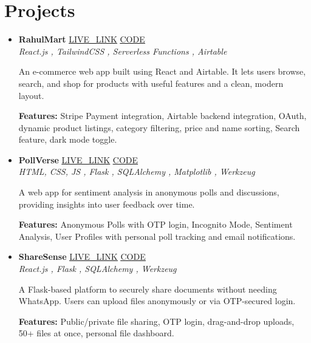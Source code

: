 \documentclass[letterpaper,10pt]{article}
\begin{document}
\section{Projects}
\begin{itemize}

  \item \textbf{RahulMart} \hfill
    \underline{\href{https://rahulmart.netlify.app}{LIVE\_LINK}} \hspace{0.3cm}
    \underline{\href{https://github.com/Rahul122703/rahulmart}{CODE}} \\
  \textit{React.js , TailwindCSS , Serverless Functions , Airtable}

  An e-commerce web app built using React and Airtable. It lets users browse, search, and shop for products with useful features and a clean, modern layout.

  \textbf{Features:} Stripe Payment integration, Airtable backend integration, OAuth, dynamic product listings, category filtering, price and name sorting, Search feature, dark mode toggle.

  \item \textbf{PollVerse} \hfill
    \underline{\href{https://pollversey.onrender.com}{LIVE\_LINK}} \hspace{0.3cm}
    \underline{\href{https://github.com/Rahul122703/pollverse}{CODE}} \\
  \textit{HTML, CSS, JS , Flask , SQLAlchemy , Matplotlib , Werkzeug}

  A web app for sentiment analysis in anonymous polls and discussions, providing insights into user feedback over time.

  \textbf{Features:} Anonymous Polls with OTP login, Incognito Mode, Sentiment Analysis, User Profiles with personal poll tracking and email notifications.

  \item \textbf{ShareSense} \hfill
  \underline{\href{https://sharesense.onrender.com}{LIVE\_LINK}} \hspace{0.3cm}
  \underline{\href{https://github.com/Rahul122703/rshare}{CODE}} \\
  \textit{React.js , Flask , SQLAlchemy , Werkzeug}

  A Flask-based platform to securely share documents without needing WhatsApp. Users can upload files anonymously or via OTP-secured login.

  \textbf{Features:} Public/private file sharing, OTP login, drag-and-drop uploads, 50+ files at once, personal file dashboard.


\end{itemize}
\end{document}
